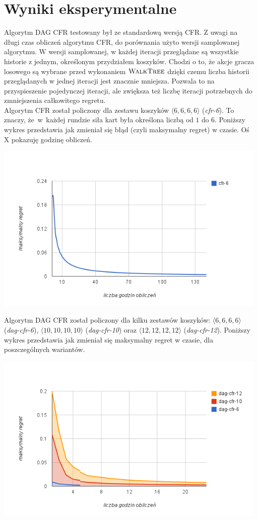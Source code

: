 \documentclass[magisterska]{pracamgr}
\begin{document}
\chapter{Wyniki eksperymentalne}

\noindent
Algorytm DAG CFR testowany był ze standardową wersją CFR. Z uwagi na długi czas obliczeń
algorytmu CFR, do porównania użyto wersji samplowanej algorytmu. W wersji samplowanej,
w każdej iteracji przeglądane są wszystkie historie z jednym, określonym przydziałem koszyków.
Chodzi o to, że akcje gracza losowego są wybrane przed wykonaniem $\Call{WalkTree}{}$ dzięki czemu
liczba historii przeglądanych w jednej iteracji jest znacznie mniejsza.
Pozwala to na przyspieszenie pojedynczej iteracji, ale zwiększa też liczbę iteracji potrzebnych do
zmniejszenia całkowitego regretu. \\

\noindent
Algorytm CFR został policzony dla zestawu koszyków $\langle6,6,6,6\rangle$ (\emph{cfr-6}). To znaczy, że~w~każdej rundzie
siła kart była określona liczbą od $1$ do $6$. Poniższy wykres przedstawia jak zmieniał się
błąd (czyli maksymalny regret) w czasie. Oś X pokazuję godzinę obliczeń. 

\includegraphics[scale=0.7]{wykres1.png}

\noindent
Algorytm DAG CFR został policzony dla kilku zestawów koszyków: $\langle 6,6,6,6 \rangle$ (\emph{dag-cfr-6}),
$\langle10,10,10,10\rangle$ (\emph{dag-cfr-10}) oraz $\langle12,12,12,12\rangle$ (\emph{dag-cfr-12}).
Poniższy wykres przedstawia jak zmieniał się maksymalny regret w czasie, dla poszczególnych wariantów.

\includegraphics[scale=0.7]{wykres2.png}
\end{document}
